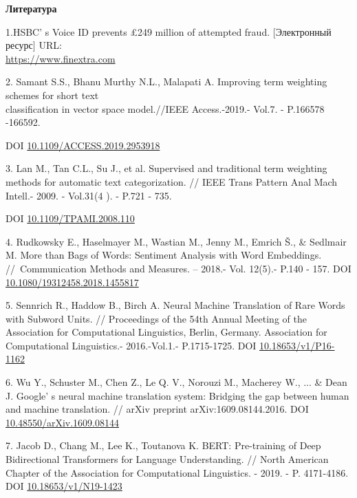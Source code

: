 \begin{center}
{\bfseries Литература}
\end{center}

\begin{references}
1.HSBC' s Voice ID prevents £249 million of attempted
fraud. {[}Электронный ресурс{]} URL:
\\\href{https://www.finextra.com/newsarticle/37989/hsbcs-voice-id-prevents-249-million-of-attempted-fraud}{https://www.finextra.com}

2. Samant S.S., Bhanu Murthy N.L., Malapati A. Improving term weighting
schemes for short text \\classification in vector space model.//IEEE
Access.-2019.- Vol.7. - P.166578 -166592.

DOI
\href{https://doi.org/10.1109/ACCESS.2019.2953918}{10.1109/ACCESS.2019.2953918}

3. Lan M., Tan C.L., Su J., et al. Supervised and traditional term
weighting methods for automatic text categorization. // IEEE Trans
Pattern Anal Mach Intell.- 2009. - Vol.31(4 ). - P.721 - 735.

DOI
\href{https://doi.org/10.1109/tpami.2008.110}{10.1109/TPAMI.2008.110}

4. Rudkowsky E., Haselmayer M., Wastian M., Jenny M., Emrich Š., \&
Sedlmair M. More than Bags of Words: Sentiment Analysis with Word
Embeddings. //~Communication Methods and Measures. -- 2018.- Vol.
12(5).- P.140 - 157. DOI
\href{http://dx.doi.org/10.1080/19312458.2018.1455817}{10.1080/19312458.2018.1455817}

5. Sennrich R., Haddow B., Birch A. Neural Machine Translation of Rare
Words with Subword Units. // Proceedings of the 54th Annual Meeting of
the Association for Computational Linguistics, Berlin, Germany.
Association for Computational Linguistics.- 2016.-Vol.1.- P.1715-1725.
DOI \href{https://doi.org/10.18653/v1/P16-1162}{10.18653/v1/P16-1162}

6. Wu Y., Schuster M., Chen Z., Le Q. V., Norouzi M., Macherey W., ...
\& Dean J. Google' s neural machine translation system:
Bridging the gap between human and machine translation. // arXiv
preprint arXiv:1609.08144.2016. DOI
\href{http://dx.doi.org/10.48550/arXiv.1609.08144}{10.48550/arXiv.1609.08144}

7. Jacob D., Chang M., Lee K., Toutanova K. BERT: Pre-training of Deep
Bidirectional Transformers for Language Understanding. // North American
Chapter of the Association for Computational Linguistics. - 2019. - P.
4171-4186. DOI
\href{https://doi.org/10.18653/v1/N19-1423}{10.18653/v1/N19-1423}


\end{references}
